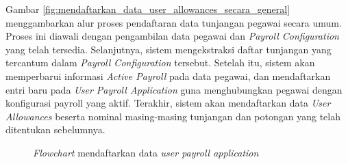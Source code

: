 Gambar \ref{fig:mendaftarkan_data_user_allowances_secara_general} menggambarkan alur proses pendaftaran data tunjangan pegawai secara umum. Proses ini diawali dengan pengambilan data pegawai dan \textit{Payroll Configuration} yang telah tersedia. Selanjutnya, sistem mengekstraksi daftar tunjangan yang tercantum dalam \textit{Payroll Configuration} tersebut. Setelah itu, sistem akan memperbarui informasi \textit{Active Payroll} pada data pegawai, dan mendaftarkan entri baru pada \textit{User Payroll Application} guna menghubungkan pegawai dengan konfigurasi payroll yang aktif. Terakhir, sistem akan mendaftarkan data \textit{User Allowances} beserta nominal masing-masing tunjangan dan potongan yang telah ditentukan sebelumnya.

\begin{figure}[H]
    \centering
    \caption{\textit{Flowchart} mendaftarkan data \textit{user payroll application}}
    \label{fig:mendaftarkan_data_user_payroll_application}
\end{figure}

